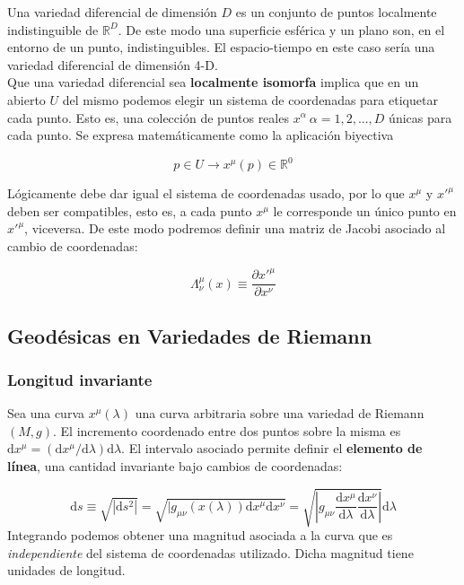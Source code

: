 \documentclass[12pt,a4paper]{book}
\numberwithin{equation}{section}
\numberwithin{figure}{section}
\newcommand{\parciales}[2]{\frac{\partial #1}{\partial #2}}
\newcommand{\D}{\mathrm{d}}
\newcommand{\derivadas}[2]{\frac{\D #1}{\D #2}}
\begin{document}
Una variedad diferencial de dimensión $D$ es un conjunto de puntos localmente indistinguible de $\mathbb{R}^D$. De este modo una superficie esférica y un plano son, en el entorno de un punto, indistinguibles. El espacio-tiempo en este caso sería una variedad diferencial de dimensión 4-D. \\

Que una variedad diferencial sea \textbf{localmente isomorfa} implica que en un abierto $U$ del mismo podemos elegir un sistema de coordenadas para etiquetar cada punto. Esto es, una colección de puntos reales $x^{\alpha} \ \alpha=1,2,...,D$ únicas para cada punto. Se expresa matemáticamente como la aplicación biyectiva 

\begin{equation}
p \in U \longrightarrow x^{\mu} (p) \in \mathbb{R}^0
\end{equation}

Lógicamente debe dar igual el sistema de coordenadas usado, por lo que $x^{\mu}$ y $x'^{\mu}$ deben ser compatibles, esto es, a cada punto $x^{\mu}$ le corresponde un único punto en $x'^{\mu}$,  viceversa. De este modo podremos definir una matriz de Jacobi asociado al cambio de coordenadas:

\begin{equation}
\Lambda_{\nu}^{\mu} (x) \equiv \parciales{x'^{\mu}}{x^{\nu}} 
\end{equation}

\subsection{Geodésicas en Variedades de Riemann}

\subsubsection{Longitud invariante}

Sea una curva $x^\mu (\lambda)$ una curva arbitraria sobre una variedad de Riemann $(M,g)$. El incremento coordenado entre dos puntos sobre la misma es $\D x^\mu = (\D x^\mu / \D \lambda) \D \lambda$. El intervalo asociado permite definir el \textbf{elemento de línea}, una cantidad invariante bajo cambios de coordenadas:


\begin{equation}
\D s \equiv \sqrt{|\D s^2 |} = \sqrt{|g_{\mu \nu} (x(\lambda)) \D x^\mu \D x^\nu} = \sqrt{\left| g_{\mu \nu} \derivadas{x^\mu}{\lambda} \derivadas{x^\nu}{\lambda} \right|} \D \lambda
\end{equation}
Integrando podemos obtener una magnitud asociada a la curva que es \textit{independiente} del sistema de coordenadas utilizado. Dicha magnitud tiene unidades de longitud.
\end{document}
